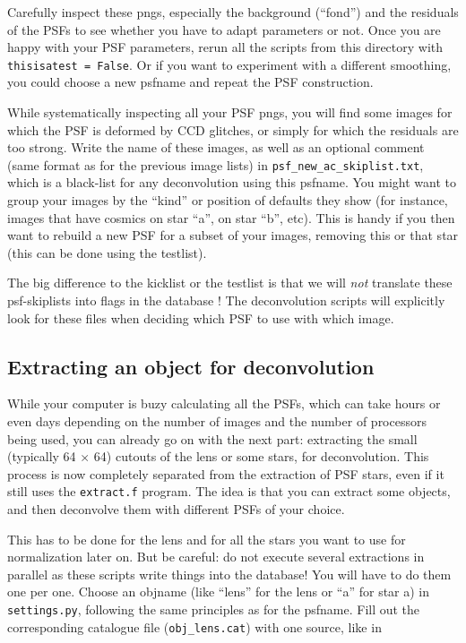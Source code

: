 Carefully inspect these pngs, especially the background (``fond'') and the residuals of the PSFs to see whether you have to adapt parameters or not. Once you are happy with your PSF parameters, rerun all the scripts from this directory with \verb+thisisatest = False+. Or if you want to experiment with a different smoothing, you could choose a new psfname and repeat the PSF construction.

While systematically inspecting all your PSF pngs, you will find some images for which the PSF is deformed by CCD glitches, or simply for which the residuals are too strong. Write the name of these images, as well as an optional comment (same format as for the previous image lists) in \verb+psf_new_ac_skiplist.txt+, which is a black-list for any deconvolution using this psfname. You might want to group your images by the ``kind'' or position of defaults they show (for instance, images that have cosmics on star ``a'', on star ``b'', etc). This is handy if you then want to rebuild a new PSF for a subset of your images, removing this or that star (this can be done using the testlist).

The big difference to the kicklist or the testlist is that we will \emph{not} translate these psf-skiplists into flags in the database ! The deconvolution scripts will explicitly look for these files when deciding which PSF to use with which image.

\subsection{Extracting an object for deconvolution}

While your computer is buzy calculating all the PSFs, which can take hours or even days depending on the number of images and the number of processors being used, you can already go on with the next part: extracting the small (typically 64 $\times$ 64) cutouts of the lens or some stars, for deconvolution. This process is now completely separated from the extraction of PSF stars, even if it still uses the \verb+extract.f+ program. The idea is that you can extract some objects, and then deconvolve them with different PSFs of your choice.

This has to be done for the lens and for all the stars you want to use for normalization later on. But be careful: do not execute several extractions in parallel as these scripts write things into the database! You will have to do them one per one.
Choose an objname (like ``lens'' for the lens or ``a'' for star a) in \verb+settings.py+, following the same principles as for the psfname. Fill out the corresponding catalogue file (\verb+obj_lens.cat+) with one source, like in

